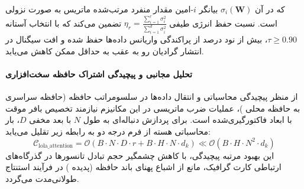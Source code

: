 که در آن $\sigma_i(\mathbf{W})$ بیانگر $i$-امین مقدار منفرد مرتب‌شده ماتریس به صورت نزولی است. نسبت حفظ انرژی طیفی $\eta_r = \frac{\sum_{i=1}^r \sigma_i^2}{\sum_{i=1}^{d} \sigma_i^2}$ تضمین می‌کند که با انتخاب آستانه $\tau \ge 0.90$، بیش از نود درصد از پراکندگی واریانس داده‌ها حفظ شده و افت سیگنال در انتشار گرادیان رو به عقب به حداقل ممکن کاهش می‌یابد.

\paragraph{تحلیل مجانبی و پیچیدگی اشتراک حافظه سخت‌افزاری}
از منظر پیچیدگی محاسباتی و انتقال داده‌ها در سلسومراتب حافظه (حافظه سراسری  به حافظه محلی )، عملیات ضرب ماتریسی در این مکانیزم نیازمند تخصیص بافر موقت با ابعاد فاکتورگیری‌شده است. برای پردازش دنباله‌ای به طول $N$ با بعد مخفی $D$، بار محاسباتی هسته از فرم درجه دو به رابطه زیر تقلیل می‌یابد:
\begin{equation}
\label{eq:complexity_lola_attention}
\mathcal{C}_{\text{lola\_attention}} = \mathcal{O}\left( B \cdot N \cdot D \cdot r + B \cdot H \cdot N \cdot d_k \right) \ll \mathcal{O}\left( B \cdot H \cdot N^2 \cdot d_k \right)
\end{equation}
این بهبود مرتبه پیچیدگی، با کاهش چشمگیر حجم تبادل تانسورها در گذرگاه‌های ارتباطی کارت گرافیک، مانع از اشباع پهنای باند حافظه (پدیده ) در فرآیند استنتاج طولانی‌مدت می‌گردد.

